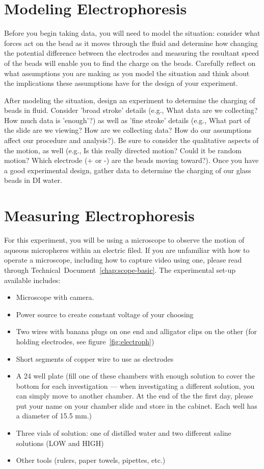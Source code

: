 \section{Modeling Electrophoresis}
Before you begin taking data, you will need to model the situation: consider what forces act on the bead as it moves through the fluid and determine how changing the potential difference between the electrodes and measuring the resultant speed of the beads will enable you to find the charge on the beads. 
Carefully reflect on what assumptions you are making as you model the situation and think about the implications these assumptions have for the design of your experiment.
\par 
After modeling the situation, design an experiment to determine the charging of beads in fluid. 
Consider 'broad stroke' details (e.g., What data are we collecting? How much data is 'enough'?) as well as 'fine stroke' details (e.g., What part of the slide are we viewing? How are we collecting data? How do our assumptions affect our procedure and analysis?). 
Be sure to consider the qualitative aspects of the motion, as well (e.g., Is this really directed motion? Could it be random motion? Which electrode (+ or -) are the beads moving toward?). 
Once you have a good experimental design, gather data to determine the charging of our glass beads in DI water.

\section{Measuring Electrophoresis}
For this experiment, you will be using a microscope to observe the motion of aqueous micropheres within an electric filed. If you are unfamiliar with how to operate a microscope, including how to capture video using one, please read through Technical~Document~\ref{chap:scope-basic}. The experimental set-up available includes:
\begin{itemize}
\itemsep-0.3em
\item Microscope with camera.
\item Power source to create constant voltage of your choosing
\item Two wires with banana plugs on one end and alligator clips on the other (for holding electrodes, see figure~\ref{fig:electroph})
\item Short segments of copper wire to use as electrodes
\item A 24 well plate (fill one of these chambers with enough solution to cover the bottom for each investigation — when investigating a different solution, you can simply move to another chamber. At the end of the the first day, please put your name on your chamber slide and store in the cabinet. Each well has a diameter of 15.5 mm.)
\item Three vials of solution: one of distilled water and two different saline solutions (LOW and HIGH)
\item Other tools (rulers, paper towels, pipettes, etc.)
\end{itemize}

